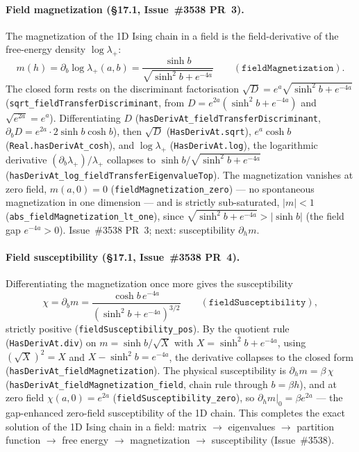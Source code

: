 \documentclass[a4paper,11pt]{article}
\begin{document}
\paragraph{Field magnetization (\S17.1, Issue~\#3538 PR~3).}
The magnetization of the 1D Ising chain in a field is the field-derivative of the
free-energy density $\log\lambda_+$:
\[
  m(h) = \partial_b \log\lambda_+(a,b)
       = \frac{\sinh b}{\sqrt{\sinh^2 b + e^{-4a}}}
  \qquad (\texttt{fieldMagnetization}).
\]
The closed form rests on the discriminant factorisation $\sqrt{D} =
e^a\sqrt{\sinh^2 b + e^{-4a}}$ (\texttt{sqrt\_fieldTransferDiscriminant}, from
$D = e^{2a}(\sinh^2 b + e^{-4a})$ and $\sqrt{e^{2a}} = e^a$). Differentiating
$D$ (\texttt{hasDerivAt\_fieldTransferDiscriminant}, $\partial_b D =
e^{2a}\cdot 2\sinh b\cosh b$), then $\sqrt{D}$
(\texttt{HasDerivAt.sqrt}), $e^a\cosh b$ (\texttt{Real.hasDerivAt\_cosh}), and
$\log\lambda_+$ (\texttt{HasDerivAt.log}), the logarithmic derivative
$(\partial_b\lambda_+)/\lambda_+$ collapses to $\sinh b/\sqrt{\sinh^2 b +
e^{-4a}}$ (\texttt{hasDerivAt\_log\_fieldTransferEigenvalueTop}). The
magnetization vanishes at zero field, $m(a,0) = 0$
(\texttt{fieldMagnetization\_zero}) --- no spontaneous magnetization in one
dimension --- and is strictly sub-saturated, $|m| < 1$
(\texttt{abs\_fieldMagnetization\_lt\_one}), since $\sqrt{\sinh^2 b + e^{-4a}} >
|\sinh b|$ (the field gap $e^{-4a} > 0$). Issue~\#3538 PR~3; next: susceptibility
$\partial_h m$.

\paragraph{Field susceptibility (\S17.1, Issue~\#3538 PR~4).}
Differentiating the magnetization once more gives the susceptibility
\[
  \chi = \partial_b m
       = \frac{\cosh b\,e^{-4a}}{(\sinh^2 b + e^{-4a})^{3/2}}
  \qquad (\texttt{fieldSusceptibility}),
\]
strictly positive (\texttt{fieldSusceptibility\_pos}). By the quotient rule
(\texttt{HasDerivAt.div}) on $m = \sinh b/\sqrt{X}$ with $X = \sinh^2 b +
e^{-4a}$, using $(\sqrt{X})^2 = X$ and $X - \sinh^2 b = e^{-4a}$, the derivative
collapses to the closed form (\texttt{hasDerivAt\_fieldMagnetization}). The
physical susceptibility is $\partial_h m = \beta\,\chi$
(\texttt{hasDerivAt\_fieldMagnetization\_field}, chain rule through $b = \beta h$),
and at zero field $\chi(a,0) = e^{2a}$ (\texttt{fieldSusceptibility\_zero}), so
$\partial_h m|_0 = \beta e^{2a}$ --- the gap-enhanced zero-field susceptibility of
the 1D chain. This completes the exact solution of the 1D Ising chain in a field:
matrix $\to$ eigenvalues $\to$ partition function $\to$ free energy $\to$
magnetization $\to$ susceptibility (Issue~\#3538).
\end{document}
